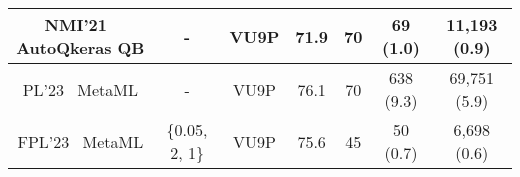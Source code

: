 \begin{table}[t]
{\begin{threeparttable}
\begin{tabular}{c| c | c |c |c | c |c }
NMI'21~\cite{coelho2021automatic} AutoQkeras QB
& - & VU9P & 71.9 & 70
& 69 (1.0)
& 11,193 (0.9)
\\
\midrule
PL'23~\cite{que2023metaml} MetaML 
&  - & VU9P &  76.1 & 70 
& 638 (9.3)
& 69,751 (5.9)
  \\
\midrule
FPL'23~\cite{que2023metaml} MetaML
&  \{0.05, 2, 1\}  & VU9P &  75.6 &45 
& 50 (0.7)
& 6,698 (0.6)
  \\
\midrule


\end{tabular}
\end{threeparttable}}
\end{table}
